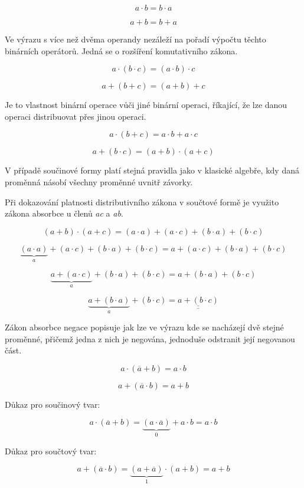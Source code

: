 {$$ a \cdot b = b \cdot a $$

$$ a + b = b + a $$


Ve výrazu s více než dvěma operandy nezáleží na pořadí výpočtu těchto binárních operátorů. Jedná se o rozšíření komutativního zákona.

$$ a \cdot (b \cdot c) = (a \cdot b) \cdot c $$

$$ a + (b + c) = (a + b) + c $$


Je to vlastnost binární operace vůči jiné binární operaci, říkající, že lze danou operaci distribuovat přes jinou operaci.

$$ a \cdot (b + c) = a \cdot b + a \cdot c $$

$$ a + (b \cdot c) = (a + b) \cdot (a + c) $$

V případě součinové formy platí stejná pravidla jako v klasické algebře, kdy daná proměnná násobí všechny proměnné uvnitř závorky.

Při dokazování platnosti distributivního zákona v součtové formě je využito zákona absorbce u členů {\it ac} a {\it ab}.

$$(a + b) \cdot (a + c) = (a \cdot a) + (a \cdot c) + (b \cdot a) + (b \cdot c)$$

$$ \underbrace {(a \cdot a)}_{a} + (a \cdot c) + (b \cdot a) + (b \cdot c) =  a + (a\cdot c) + (b \cdot a) + (b \cdot c)$$

$$ \underbrace{a + (a\cdot c)}_{a} + (b \cdot a) + (b \cdot c) = a + (b \cdot a) + (b \cdot c)$$

$$ \underbrace{a + (b \cdot a)}_{a} + (b \cdot c) = \underline {\underline{a + (b \cdot c)}}$$


Zákon absorbce negace popisuje jak lze ve výrazu kde se nacházejí dvě stejné proměnné, přičemž jedna z nich je negována, jednoduše odstranit její negovanou část.

$$ a \cdot (\overline {a} + b ) = a \cdot b $$

$$ a + (\overline{a} \cdot b) = a + b $$

Důkaz pro součinový tvar:

$$ a \cdot (\overline {a} + b ) = \underbrace{(a \cdot \overline a)}_0 + a \cdot b = a \cdot b $$

Důkaz pro součtový tvar:

$$ a + (\overline{a} \cdot b) = \underbrace{(a + \overline {a})}_1 \cdot (a + b)  = a + b$$

}
